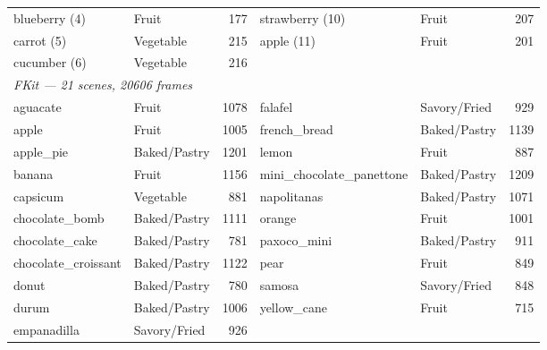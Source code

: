 \begin{table}[htb]
\begin{tabular}{llr@{\hskip 2em}llr}
blueberry (4) & Fruit & 177 & strawberry (10) & Fruit & 207 \\
carrot (5) & Vegetable & 215 & apple (11) & Fruit & 201 \\
cucumber (6) & Vegetable & 216 &  &  &  \\
\midrule
\multicolumn{6}{l}{\textit{FKit --- 21 scenes, 20606 frames}} \\
aguacate & Fruit & 1078 & falafel & Savory/Fried & 929 \\
apple & Fruit & 1005 & french\_bread & Baked/Pastry & 1139 \\
apple\_pie & Baked/Pastry & 1201 & lemon & Fruit & 887 \\
banana & Fruit & 1156 & mini\_chocolate\_panettone & Baked/Pastry & 1209 \\
capsicum & Vegetable & 881 & napolitanas & Baked/Pastry & 1071 \\
chocolate\_bomb & Baked/Pastry & 1111 & orange & Fruit & 1001 \\
chocolate\_cake & Baked/Pastry & 781 & paxoco\_mini & Baked/Pastry & 911 \\
chocolate\_croissant & Baked/Pastry & 1122 & pear & Fruit & 849 \\
donut & Baked/Pastry & 780 & samosa & Savory/Fried & 848 \\
durum & Baked/Pastry & 1006 & yellow\_cane & Fruit & 715 \\
empanadilla & Savory/Fried & 926 &  &  &  \\
\bottomrule
\end{tabular}
\end{table}
